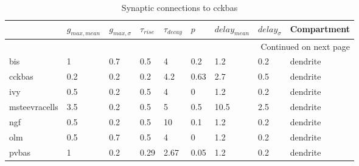 \begin{longtable}{lllllllll}
\caption{Synaptic connections to cckbas}\label{cckbas_synapses}\\
\toprule
{} & $g_{max, mean}$ & $g_{max, \sigma}$ & $\tau_{rise}$ & $\tau_{decay}$ &  $p$ & $delay_{mean}$ & $delay_{\sigma}$ & Compartment \\
\midrule
\endhead
\midrule
\multicolumn{9}{r}{{Continued on next page}} \\
\midrule
\endfoot

\bottomrule
\endlastfoot
bis           &    1 &      0.7 &      0.5 &         4 &   0.2 &   1.2 &       0.2 &      dendrite\ \\
cckbas        &  0.2 &      0.2 &      0.2 &       4.2 &  0.63 &   2.7 &       0.5 &      dendrite\ \\
ivy           &  0.5 &      0.2 &      0.5 &         4 &     0 &   1.2 &       0.2 &      dendrite\ \\
msteevracells &  3.5 &      0.2 &      0.5 &         5 &   0.5 &  10.5 &       2.5 &      dendrite\ \\
ngf           &  0.5 &      0.2 &      0.5 &        10 &   0.1 &   1.2 &       0.2 &      dendrite\ \\
olm           &  0.5 &      0.7 &      0.5 &         4 &     0 &   1.2 &       0.2 &      dendrite\ \\
pvbas         &    1 &      0.2 &     0.29 &      2.67 &  0.05 &   1.2 &       0.2 &      dendrite\ \\
\end{longtable}
